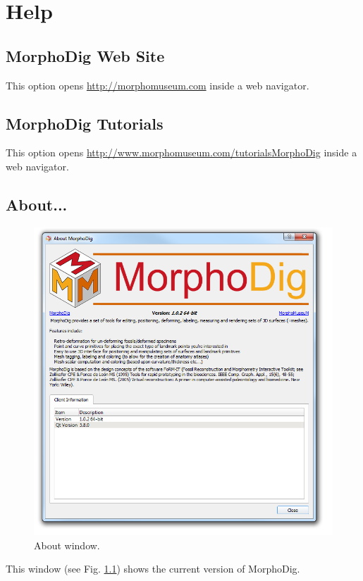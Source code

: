 
\chapter{Help}

\minitoc 

\section{MorphoDig Web Site } 
This option opens \url{http://morphomuseum.com} inside a web navigator.
\section{MorphoDig Tutorials } 
This option opens \url{http://www.morphomuseum.com/tutorialsMorphoDig}  inside a web navigator.
\section{About...} 
\begin{figure}
  \centering
  \includegraphics[scale=0.5]{images/15/about.png} 
	\caption{About window.}
\label{about}
 
\end{figure}

This window (see Fig. \ref{about}) shows the current version of MorphoDig.
